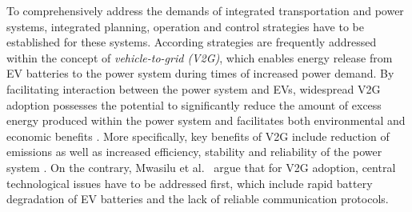 To comprehensively address the demands of integrated transportation and power systems, integrated planning, operation and control strategies have to be established for these systems. According strategies are frequently addressed within the concept of \textit{vehicle-to-grid (V2G)}, which enables energy release from EV batteries to the power system during times of increased power demand. By facilitating interaction between the power system and EVs, widespread V2G adoption possesses the potential to significantly reduce the amount of excess energy produced within the power system and facilitates both environmental and economic benefits \cite{richardson2013electric, faria2012sustainability, mwasilu2014electric}. More specifically, key benefits of V2G include reduction of emissions as well as increased efficiency, stability and reliability of the power system \cite{yilmaz2013review}.
On the contrary, Mwasilu et al.~\cite{mwasilu2014electric} argue that for V2G adoption, central technological issues 
have to be addressed first, which include rapid battery degradation of EV batteries and the lack of reliable communication protocols.





%
